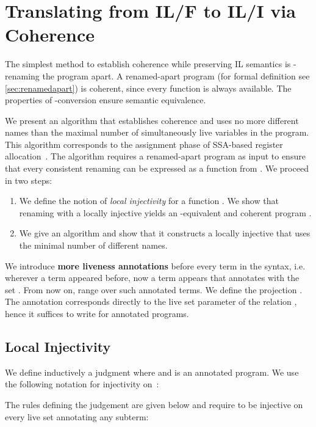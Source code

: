 \documentclass[openright,a4paper,11pt]{scrartcl}
\newcommand{\myref}[1]{\autoref{#1}}
\theoremstyle{plain}
\theoremstyle{plain}
\theoremstyle{plain}
\theoremstyle{plain}
\theoremstyle{nonumberplain}
\begin{document}
\section{Translating from IL/F to IL/I via Coherence}
\label{trans:fct}
\label{sec:destr}
\label{sec:rassign}
\label{sec:il:funcoh}
 The simplest method to establish coherence while preserving IL semantics is -renaming the program apart.
A renamed-apart program (for formal definition see \myref{sec:renamedapart}) is coherent, since every function is always available.
The properties of -conversion ensure semantic equivalence.

We present an algorithm that establishes coherence and uses no more different names than the maximal number of simultaneously live variables in the program.
This algorithm corresponds to the assignment phase of SSA-based register allocation~\cite{DBLP:conf/cc/HackGG06}. The algorithm requires a renamed-apart program as input to ensure that every consistent renaming can be expressed as a function from .
We proceed in two steps:
\begin{enumerate}
\item We define the notion of \emph{local injectivity} for a function .
      We show that renaming with a locally injective  yields an -equivalent and coherent program .
\item We give an algorithm  and show that it constructs a locally injective  that uses the minimal number of different names.
\end{enumerate}






\newcommand{\sterm}{\ensuremath{s}}
\newcommand{\tterm}{\ensuremath{t}}
We introduce \textbf{more liveness annotations} before every term in the syntax, i.e. wherever a term  appeared before, now a term  appears that annotates  with the set .
From now on,  range over such annotated terms.
We define the projection .
The annotation corresponds directly to the live set parameter  of the relation , hence it suffices to write  for annotated programs.

\subsection{Local Injectivity}
We define inductively a judgment  where  and  is an annotated program.
We use the following notation for injectivity on~:

The rules defining the judgement are given below and require  to be injective on every live set  annotating any subterm:
\end{document}
